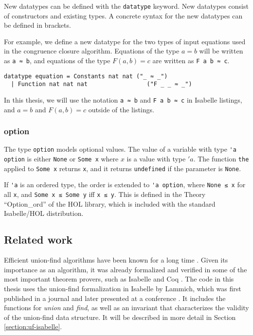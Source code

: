 New datatypes can be defined with the \lstinline|datatype| keyword. New datatypes consist of constructors and existing types. A concrete syntax for the new datatypes can be defined in brackets.

For example, we define a new datatype for the two types of input equations used in the congruence closure algorithm. Equations of the type $a = b$ will be written as \lstinline{a ≈ b}, and equations of the type $F(a, b) = c$ are written as \lstinline{F a b ≈ c}.

\begin{lstlisting}
datatype equation = Constants nat nat ("_ ≈ _")
  | Function nat nat nat                 ("F _ _ ≈ _")
\end{lstlisting}

In this thesis, we will use the notation \lstinline{a ≈ b} and \lstinline{F a b ≈ c} in Isabelle listings, and $a = b$ and $F(a, b) = c$ outside of the listings.

\subsubsection{option}

The type \lstinline{option} models optional values. The value of a variable with type \lstinline{'a option} is either \lstinline|None| or \lstinline|Some x| where $x$ is a value with type $'a$. The function \lstinline|the| applied to \lstinline|Some x| returns \lstinline|x|, and it returns \lstinline|undefined| if the parameter is \lstinline|None|.

If \lstinline{'a} is an ordered type, the order is extended to \lstinline{'a option}, where \lstinline{None ≤ x} for all \lstinline|x|, and \lstinline{Some x ≤ Some y} iff \lstinline{x ≤ y}. This is defined in the Theory ``Option\_ord'' of the HOL library, which is included with the standard Isabelle/HOL distribution.

\subsection{Related work}

Efficient union-find algorithms have been known for a long time \cite{unionfind-og, Tarjan}. Given its importance as an algorithm, it was already formalized and verified in some of the most important theorem provers, such as Isabelle and Coq \cite{unionfind-persistent}. The code in this thesis uses the union-find formalization in Isabelle by Lammich, which was first published in a journal \cite{unionfind-isabelle} and later presented at a conference \cite{unionfind-isabelle-conference}. It includes the functions for \emph{union} and \emph{find}, as well as an invariant that characterizes the validity of the union-find data structure. It will be described in more detail in Section \ref{section:uf-isabelle}.

